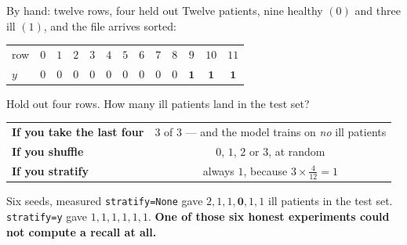 \documentclass[aspectratio=169]{beamer}
\begin{document}
\begin{frame}[shrink=8]{By hand: twelve rows, four held out}
  Twelve patients, nine healthy $(0)$ and three ill $(1)$, and the file
  arrives sorted:
  \begin{center}\small
  \begin{tabular}{@{}lcccccccccccc@{}}
    \toprule
    row & $0$ & $1$ & $2$ & $3$ & $4$ & $5$ & $6$ & $7$ & $8$ & $9$ & $10$ &
      $11$\\
    $y$ & $0$&$0$&$0$&$0$&$0$&$0$&$0$&$0$&$0$&
      $\mathbf{1}$&$\mathbf{1}$&$\mathbf{1}$\\
    \bottomrule
  \end{tabular}
  \end{center}
  \vspace{0.2em}
  Hold out four rows. How many ill patients land in the test set?
  \begin{center}\small
  \begin{tabular}{@{}lc@{}}
    \toprule
    \textbf{If you take the last four} & $3$ of $3$ --- and the model trains
      on \emph{no} ill patients\\
    \textbf{If you shuffle} & $0$, $1$, $2$ or $3$, at random\\
    \textbf{If you stratify} & always $1$, because $3 \times \frac{4}{12} = 1$\\
    \bottomrule
  \end{tabular}
  \end{center}
  \begin{alertblock}{Six seeds, measured}
    \small \texttt{stratify=None} gave $2,1,1,\mathbf{0},1,1$ ill patients in
    the test set. \texttt{stratify=y} gave $1,1,1,1,1,1$. \textbf{One of those
    six honest experiments could not compute a recall at all.}
  \end{alertblock}
\end{frame}
\end{document}
